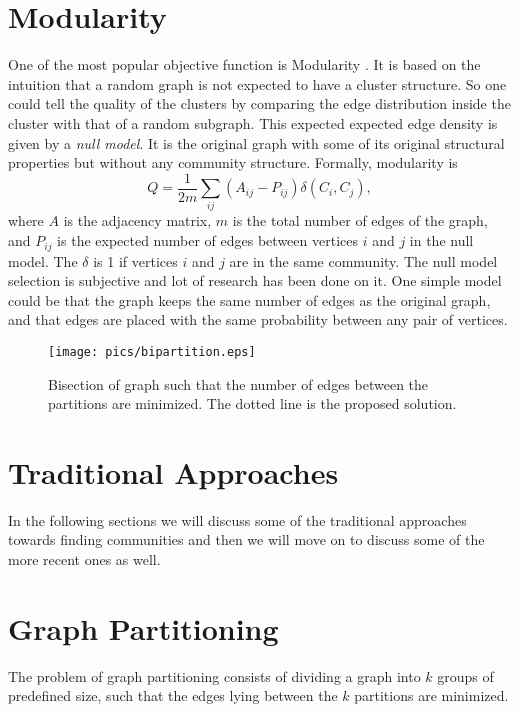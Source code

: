 \documentclass[letterpaper]{article}
\begin{document}
\section{Modularity}
One of the most popular objective function is Modularity \cite{new2004}. It is
based on the intuition that a random graph is not expected to have a cluster
structure. So one could tell the quality of the clusters by comparing the edge
distribution inside the cluster with that of a random subgraph. This expected 
expected edge density is given by a \emph{null model}. It is the original graph
with some of its original structural properties but without any community structure.
Formally, modularity is
\begin{equation} Q = \frac{1}{2m}\sum_{ij}(A_{ij}-P_{ij})\delta(C_i,C_j),\end{equation}
where $A$ is the adjacency matrix, $m$ is the total number of edges of the
graph, and $P_{ij}$ is the expected number of edges between vertices $i$ and
$j$ in the null model. The $\delta$ is 1 if vertices $i$ and $j$ are in the
same community. The null model selection is subjective and lot of research has
been done on it. One simple model could be that the graph keeps the same number
of edges as the original graph, and that edges are placed with the same
probability between any pair of vertices.




\begin{figure}
\texttt{[image: pics/bipartition.eps]}
\caption{Bisection of graph such that the number of edges between the partitions are minimized. The dotted line
is the proposed solution.}
\label{fig:bipart}
\end{figure}
\section{Traditional Approaches} In the following sections we will discuss some
of the traditional approaches towards finding communities and then we will move
on to discuss some of the more recent ones as well.  

\section{Graph
Partitioning} The problem of graph partitioning consists of dividing a graph
into $k$ groups of predefined size, such that the edges lying between the $k$
partitions are minimized. 
\end{document}

